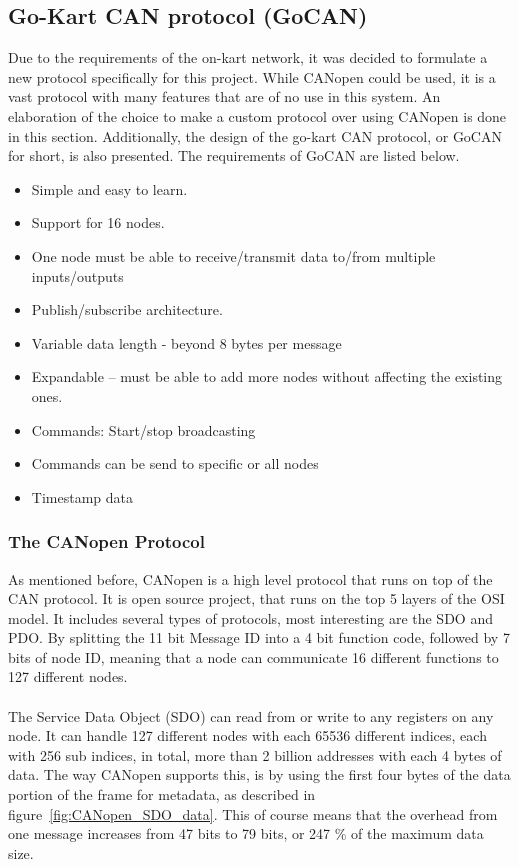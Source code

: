 
\subsection{Go-Kart CAN protocol (GoCAN)}\label{sub:CAN_protocol}
Due to the requirements of the on-kart network, it was decided to formulate a new protocol specifically for this project.
While CANopen could be used, it is a vast protocol with many features that are of no use in this system.
An elaboration of the choice to make a custom protocol over using CANopen is done in this section.
Additionally, the design of the go-kart CAN protocol, or GoCAN for short, is also presented.
The requirements of GoCAN are listed below.

\begin{itemize}
	\item Simple and easy to learn.
	\item Support for 16 nodes.
	\item One node must be able to receive/transmit data to/from multiple inputs/outputs
	\item Publish/subscribe architecture.
	\item Variable data length - beyond 8 bytes per message
	\item Expandable -- must be able to add more nodes without affecting the existing ones.
	\item Commands: Start/stop broadcasting 
	\item Commands can be send to specific or all nodes
	\item Timestamp data
\end{itemize}

\subsubsection*{The CANopen Protocol}
\label{sub:CANopen}
As mentioned before, CANopen is a high level protocol that runs on top of the CAN protocol.
It is open source project, that runs on the top 5 layers of the OSI model\cite{CANopen_introduction}.
It includes several types of protocols, most interesting are the SDO and PDO. 
By splitting the 11 bit Message ID into a 4 bit function code, followed by 7 bits of node ID, meaning that a node can communicate 16 different functions to 127 different nodes.
\\~\\
The Service Data Object (SDO) can read from or write to any registers on any node. 
It can handle 127 different nodes with each 65536 different indices, each with 256 sub indices, in total, more than 2 billion addresses with each 4 bytes of data.
The way CANopen supports this, is by using the first four bytes of the data portion of the frame for metadata, as described in figure~\ref{fig:CANopen_SDO_data}.
This of course means that the overhead from one message increases from 47 bits to 79 bits, or 247 \% of the maximum data size.\\

